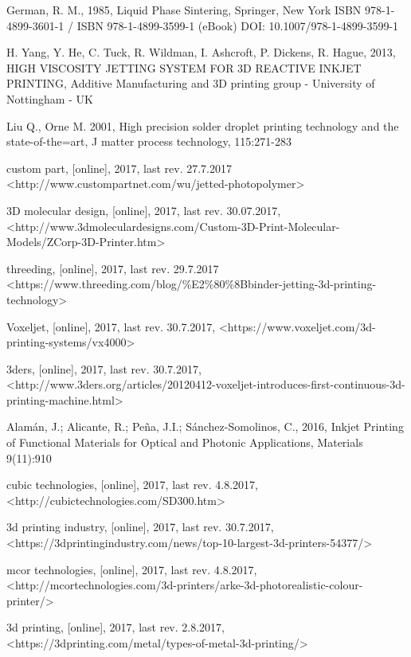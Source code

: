 \documentclass[a4paper, twoside, 11pt]{report}
\begin{document}
\begin{thebibliography}{99}
	German, R. M.,
	1985,
	Liquid Phase Sintering,
	Springer,
	New York
	ISBN 978-1-4899-3601-1 / ISBN 978-1-4899-3599-1 (eBook)
	DOI: 10.1007/978-1-4899-3599-1

	H. Yang, Y. He, C. Tuck, R. Wildman, I. Ashcroft, P. Dickens, R. Hague,
	2013,
	HIGH VISCOSITY JETTING SYSTEM FOR 3D REACTIVE INKJET PRINTING,
	Additive Manufacturing and 3D printing group - University of Nottingham - UK 

	Liu Q., Orne M.
	2001,
	High precision solder droplet printing technology and the state-of-the=art,
	J matter process technology,
	115:271-283
	
	custom part,
	[online],
	2017,
	last rev. 27.7.2017
	<http://www.custompartnet.com/wu/jetted-photopolymer>
	
	3D molecular design,
	[online],
	2017,
	last rev. 30.07.2017,
	<http://www.3dmoleculardesigns.com/Custom-3D-Print-Molecular-Models/ZCorp-3D-Printer.htm>

	threeding,
	[online],
	2017,
	last rev. 29.7.2017
	<https://www.threeding.com/blog/\%E2\%80\%8Bbinder-jetting-3d-printing-technology>
	
	Voxeljet,
	[online],
	2017,
	last rev. 30.7.2017,
	<https://www.voxeljet.com/3d-printing-systems/vx4000>
	
	3ders,
	[online],
	2017,
	last rev. 30.7.2017,
	<http://www.3ders.org/articles/20120412-voxeljet-introduces-first-continuous-3d-printing-machine.html>

	Alamán, J.; Alicante, R.; Peña, J.I.; Sánchez-Somolinos, C.,
	2016,
	Inkjet Printing of Functional Materials for Optical and Photonic Applications,
	Materials 9(11):910

	cubic technologies,
	[online],
	2017,
	last rev. 4.8.2017,
	<http://cubictechnologies.com/SD300.htm>
	
	3d printing industry,
	[online],
	2017,
	last rev. 30.7.2017,
	<https://3dprintingindustry.com/news/top-10-largest-3d-printers-54377/>

	mcor technologies,
	[online],
	2017,
	last rev. 4.8.2017,
	<http://mcortechnologies.com/3d-printers/arke-3d-photorealistic-colour-printer/>

	3d printing,
	[online],
	2017,
	last rev. 2.8.2017,
	<https://3dprinting.com/metal/types-of-metal-3d-printing/>


\end{thebibliography}
\end{document}
